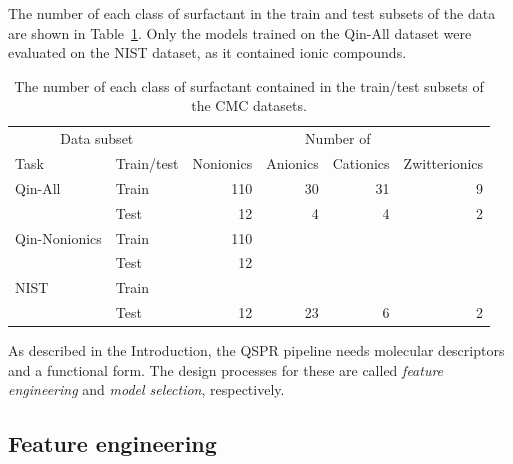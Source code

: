 The number of each class of surfactant in the train and test subsets of the data are shown in Table~\ref{tab:data-split}. Only the models trained on the Qin-All dataset were evaluated on the NIST dataset, as it contained ionic compounds.

\begin{table}
    \centering
    \caption{The number of each class of surfactant contained in the train/test subsets of the CMC datasets.}
    \label{tab:data-split}
    \begin{tabular}{@{}llrrrr@{}} \toprule \multicolumn{2}{c}{Data subset} & \multicolumn{4}{c}{Number of}                                                    \\\cmidrule(r){1-2}\cmidrule(l){3-6}
               Task                                                    & Train/test                    & Nonionics & Anionics & Cationics & Zwitterionics \\\midrule
               Qin-All                                                 & Train                         & 110       & 30       & 31        & 9             \\
                                                                       & Test                          & 12        & 4        & 4         & 2             \\
               Qin-Nonionics                                           & Train                         & 110       &          &           &               \\
                                                                       & Test                          & 12        &          &           &               \\
               NIST                                                    & Train                         &           &          &           &               \\
                                                                       & Test                          & 12        & 23       & 6         & 2             \\\bottomrule
    \end{tabular}
\end{table}

As described in the Introduction, the QSPR pipeline needs molecular descriptors
and a functional form. The design processes for these are called \emph{feature
engineering} and \emph{model selection}, respectively.

\subsection{Feature engineering}

